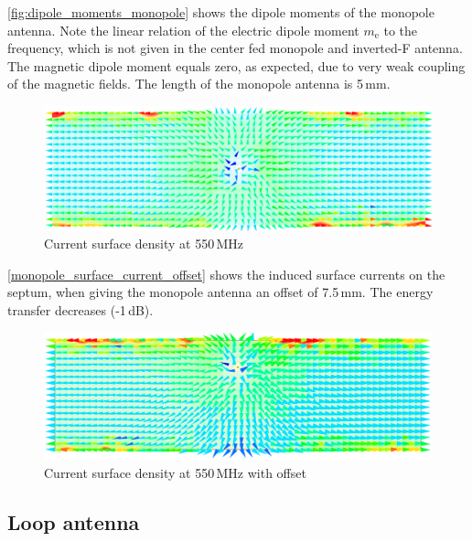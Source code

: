 \autoref{fig:dipole_moments_monopole} shows the dipole moments of the monopole antenna. Note the linear relation of the electric dipole moment $m_\mathrm{e}$ to the frequency, which is not given in the center fed monopole and inverted-F antenna. The magnetic dipole moment equals zero, as expected, due to very weak coupling of the magnetic fields. The length of the monopole antenna is 5\,mm.



\begin{figure}[h]
    \centering
    \includegraphics[width=1\linewidth]{content//30_simulations//img/monopole_surface_currents.png}
    \caption{Current surface density at 550\,MHz}
    \label{fig:monopole_surface_currents}
\end{figure}

\autoref{monopole_surface_current_offset} shows the induced surface currents on the septum, when giving the monopole antenna an offset of 7.5\,mm. The energy transfer decreases (-1\,dB).  

\begin{figure}[h]
    \centering
    \includegraphics[width=1\linewidth]{content//30_simulations//img/monopole_surface_current_offset.png}
    \caption{Current surface density at 550\,MHz with offset}
    \label{fig:monopole_surface_current_offset}
\end{figure}

\subsection{Loop antenna}

